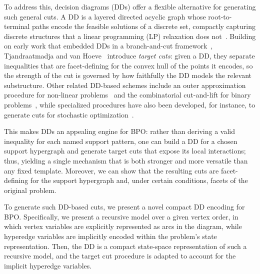 To address this, decision diagrams (DDs) offer a flexible alternative for generating such general cuts. A DD is a layered directed acyclic graph whose root-to-terminal paths encode the feasible solutions of a discrete set, compactly capturing discrete structures that a linear programming (LP) relaxation does not~\cite{bergman2016decision,castroCireBeck2022survey,vanHoeve2024intro}. Building on early work that embedded DDs in a branch-and-cut framework~\cite{beckerBehleEisenbrandWimmer2005,behle2007}, Tjandraatmadja and van Hoeve~\cite{tjandraatmadjaVanHoeve2019target} introduce \emph{target cuts}: given a DD, they separate inequalities that are facet-defining for the convex hull of the points it encodes, so the strength of the cut is governed by how faithfully the DD models the relevant substructure. Other related DD-based schemes include an outer approximation procedure for non-linear problems~\cite{davarniaVanHoeve2021outer} and the combinatorial cut-and-lift for binary problems~\cite{castroCireBeck2022cutLift}, while specialized procedures have also been developed, for instance, to generate cuts for stochastic optimization~\cite{casassus2025decision,lozano2022binary,macneil2024leveraging}. 

This makes DDs an appealing engine for BPO: rather than deriving a valid inequality for each named support pattern, one can build a DD for a chosen support hypergraph and generate target cuts that expose its local interactions; thus, yielding a single mechanism that is both stronger and more versatile than any fixed template. Moreover, we can show that the resulting cuts are facet-defining for the support hypergraph and, under certain conditions, facets of the original problem.  

To generate such DD-based cuts, we present a novel compact DD encoding for BPO. Specifically, we present a recursive model over a given vertex order, in which vertex variables are explicitly represented as arcs in the diagram, while hyperedge variables are implicitly encoded within the problem's state representation. Then, the DD is a compact state-space representation of such a recursive model, and the target cut procedure is adapted to account for the implicit hyperedge variables.

